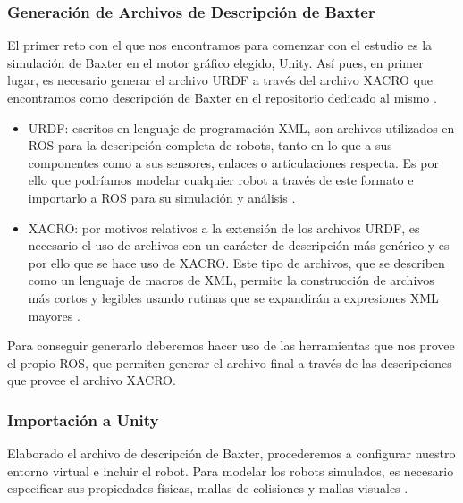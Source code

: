 \subsubsection{Generación de Archivos de Descripción de Baxter}
El primer reto con el que nos encontramos para comenzar con el estudio es la simulación de Baxter en el motor gráfico elegido, Unity. Así pues, en primer lugar, es necesario generar el archivo URDF a través del archivo XACRO que encontramos como descripción de Baxter en el repositorio dedicado al mismo \cite{64}.

\begin{itemize}
    \item URDF: escritos en lenguaje de programación XML, son archivos utilizados en ROS para la descripción completa de robots, tanto en lo que a sus componentes como a sus sensores, enlaces o articulaciones respecta. Es por ello que podríamos modelar cualquier robot a través de este formato e importarlo a ROS para su simulación y análisis \cite{65}.
    
    \item XACRO: por motivos relativos a la extensión de los archivos URDF, es necesario el uso de archivos con un carácter de descripción más genérico y es por ello que se hace uso de XACRO. Este tipo de archivos, que se describen como un lenguaje de macros de XML, permite la construcción de archivos más cortos y legibles usando rutinas que se expandirán a expresiones XML mayores \cite{66}.   
\end{itemize}

Para conseguir generarlo deberemos hacer uso de las herramientas que nos provee  
el propio ROS,  que permiten generar el archivo final a través de las descripciones que provee el archivo XACRO.

\subsubsection{Importación a Unity}
Elaborado el archivo de descripción de Baxter, procederemos a configurar nuestro entorno virtual e incluir el robot. Para modelar los robots simulados, es necesario especificar sus propiedades físicas, mallas de colisiones y mallas visuales \cite{67}.

